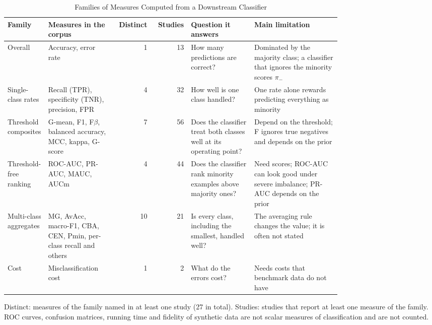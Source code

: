 \begin{table}[t]
  \caption{Families of Measures Computed from a Downstream Classifier}
  \label{tab:empirical-measures}
  \footnotesize
  \setlength{\tabcolsep}{4pt}
  \begin{tabular}{@{}p{0.12\linewidth}p{0.2\linewidth}rrp{0.19\linewidth}p{0.26\linewidth}@{}}
    \toprule
    Family & Measures in the corpus & Distinct & Studies & Question it answers & Main limitation\\
    \midrule
    Overall & Accuracy, error rate & 1 & 13 & How many predictions are correct? & Dominated by the majority class; a classifier that ignores the minority scores $\pi_-$\\
    Single-class rates & Recall (TPR), specificity (TNR), precision, FPR & 4 & 32 & How well is one class handled? & One rate alone rewards predicting everything as minority\\
    Threshold composites & G-mean, F1, F$\beta$, balanced accuracy, MCC, kappa, G-score & 7 & 56 & Does the classifier treat both classes well at its operating point? & Depend on the threshold; F ignores true negatives and depends on the prior\\
    Threshold-free ranking & ROC-AUC, PR-AUC, MAUC, AUCm & 4 & 44 & Does the classifier rank minority examples above majority ones? & Need scores; ROC-AUC can look good under severe imbalance; PR-AUC depends on the prior\\
    Multi-class aggregates & MG, AvAcc, macro-F1, CBA, CEN, Pmin, per-class recall and others & 10 & 21 & Is every class, including the smallest, handled well? & The averaging rule changes the value; it is often not stated\\
    Cost & Misclassification cost & 1 & 2 & What do the errors cost? & Needs costs that benchmark data do not have\\
    \bottomrule
  \end{tabular}
  \par\smallskip\raggedright\scriptsize Distinct: measures of the family named in at least one study (27 in total). Studies: studies that report at least one measure of the family. ROC curves, confusion matrices, running time and fidelity of synthetic data are not scalar measures of classification and are not counted.
\end{table}

